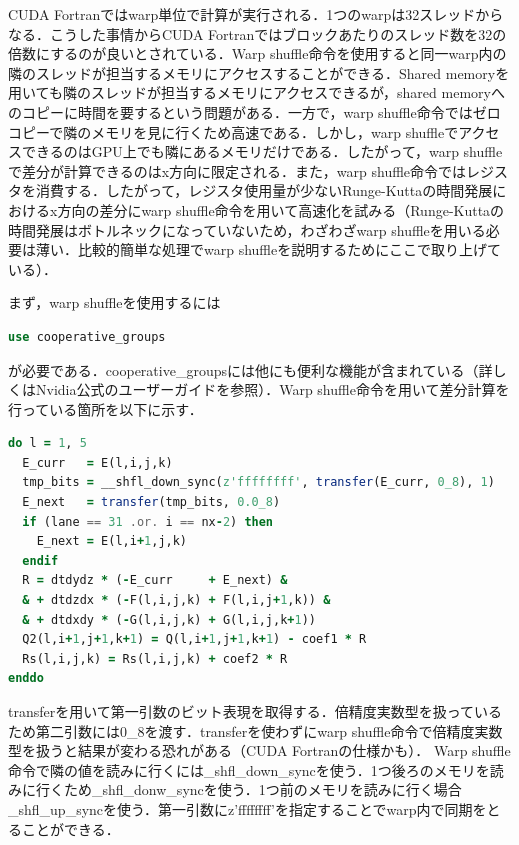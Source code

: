 CUDA Fortranではwarp単位で計算が実行される．1つのwarpは32スレッドからなる．こうした事情からCUDA Fortranではブロックあたりのスレッド数を32の倍数にするのが良いとされている．Warp shuffle命令を使用すると同一warp内の隣のスレッドが担当するメモリにアクセスすることができる．Shared memoryを用いても隣のスレッドが担当するメモリにアクセスできるが，shared memoryへのコピーに時間を要するという問題がある．一方で，warp shuffle命令ではゼロコピーで隣のメモリを見に行くため高速である．しかし，warp shuffleでアクセスできるのはGPU上でも隣にあるメモリだけである．したがって，warp shuffleで差分が計算できるのはx方向に限定される．また，warp shuffle命令ではレジスタを消費する．したがって，レジスタ使用量が少ないRunge-Kuttaの時間発展におけるx方向の差分にwarp shuffle命令を用いて高速化を試みる（Runge-Kuttaの時間発展はボトルネックになっていないため，わざわざwarp shuffleを用いる必要は薄い．比較的簡単な処理でwarp shuffleを説明するためにここで取り上げている）．

まず，warp shuffleを使用するには

\begin{lstlisting}[language=Fortran]
use cooperative_groups
\end{lstlisting}

\noindent
が必要である．cooperative\_groupsには他にも便利な機能が含まれている（詳しくはNvidia公式のユーザーガイドを参照）．Warp shuffle命令を用いて差分計算を行っている箇所を以下に示す．

\begin{lstlisting}[language=Fortran]
do l = 1, 5
  E_curr   = E(l,i,j,k)
  tmp_bits = __shfl_down_sync(z'ffffffff', transfer(E_curr, 0_8), 1)
  E_next   = transfer(tmp_bits, 0.0_8)
  if (lane == 31 .or. i == nx-2) then
    E_next = E(l,i+1,j,k)
  endif
  R = dtdydz * (-E_curr     + E_next) &
  & + dtdzdx * (-F(l,i,j,k) + F(l,i,j+1,k)) &
  & + dtdxdy * (-G(l,i,j,k) + G(l,i,j,k+1))
  Q2(l,i+1,j+1,k+1) = Q(l,i+1,j+1,k+1) - coef1 * R
  Rs(l,i,j,k) = Rs(l,i,j,k) + coef2 * R
enddo
\end{lstlisting}

\noindent
transferを用いて第一引数のビット表現を取得する．倍精度実数型を扱っているため第二引数には0\_8を渡す．transferを使わずにwarp shuffle命令で倍精度実数型を扱うと結果が変わる恐れがある（CUDA Fortranの仕様かも）．
Warp shuffle命令で隣の値を読みに行くには\_shfl\_down\_syncを使う．1つ後ろのメモリを読みに行くため\_shfl\_donw\_syncを使う．1つ前のメモリを読みに行く場合\_shfl\_up\_syncを使う．第一引数にz'ffffffff'を指定することでwarp内で同期をとることができる．
